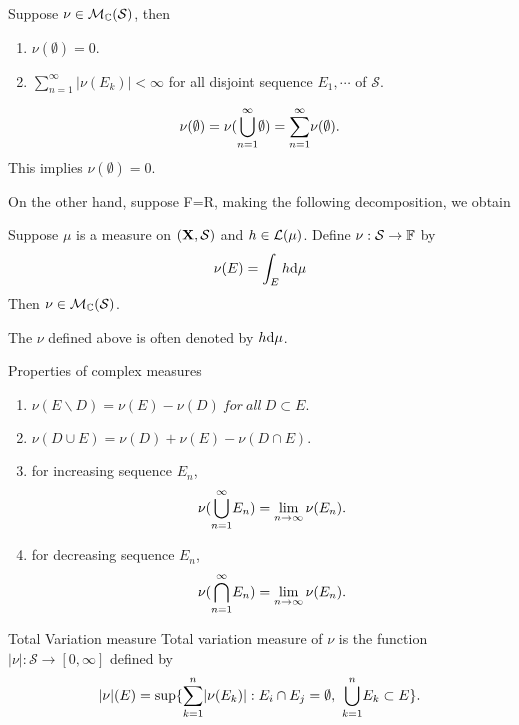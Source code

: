 \begin{stheorem}{}{}
Suppose $\nu \in \mathcal{M}_{\mathbb{C}}(\mathcal S)$, then 
\begin{enumerate}
	\item $\nu(\emptyset)=0$.
	\item $\sum_{n=1}^{\infty}|\nu(E_k)| < \infty$ for all disjoint sequence $E_1,\cdots$ of $\mathcal S$.
\end{enumerate}
\end{stheorem}
\begin{Proof}
$$
\nu(\emptyset) = \nu({\bigcup_{n=1}^{\infty}}\emptyset) = {\sum_{n=1}^{\infty}}\nu(\emptyset).
$$
This implies $\nu(\emptyset)=0$. \par
On the other hand, suppose F=R, making the following decomposition, we obtain
$$
$$
\end{Proof}

\begin{stheorem}{}{}
Suppose $\mu$ is a measure on $(\mathbf{X},\mathcal S)$ and $h \in \mathcal{L}(\mu)$. Define $\nu:\mathcal S \to \mathbb{F}$ by 
$$
\nu(E) = \int_E h \mathrm{d} \mu
$$
Then $\nu \in \mathcal{M}_{\mathbb{C}}(\mathcal S)$.
\end{stheorem}

\begin{sremark}{}{}
The $\nu$ defined above is often denoted by $h\mathrm{d}\mu$.
\end{sremark}

\begin{stheorem}{Properties of complex measures}{}
\begin{enumerate}
	\item $\nu(E\backslash D) = \nu(E)-\nu(D) \ for \ all\  D \subset E.$
	\item $\nu(D \cup E) = \nu(D) + \nu(E) - \nu(D\cap E)$.
	\item for increasing sequence $E_n$,
	$$\nu({\bigcup_{n=1}^{\infty}}E_n)=\lim_{n \to \infty}\nu(E_n). $$
	\item for decreasing sequence $E_n$,
	$$\nu({\bigcap_{n=1}^{\infty}}E_n)=\lim_{n \to \infty}\nu(E_n). $$
\end{enumerate}
\end{stheorem}

\begin{sdefinition}{Total Variation measure}{}
Total variation measure of $\nu$ is the function $|\nu|: \mathcal S \to [0,\infty]$ defined by
$$
|\nu|(E) = \sup\{\Sum{k=1}{n}|\nu(E_k)|: E_i \cap E_j =\emptyset, \ \Union{k=1}{n}E_k \subset E\}.
$$
\end{sdefinition}

